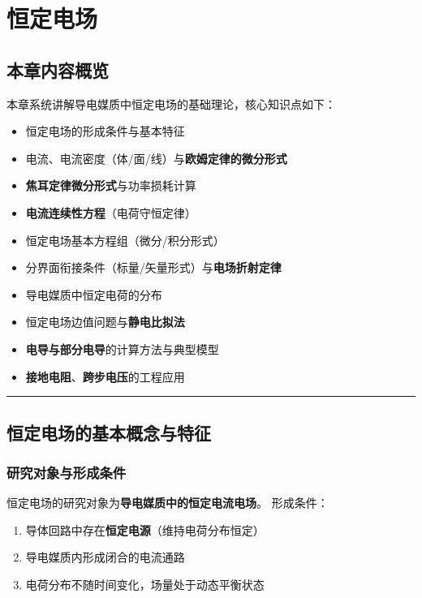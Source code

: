 
\section{恒定电场}

\subsection{本章内容概览}
本章系统讲解导电媒质中恒定电场的基础理论，核心知识点如下：
\begin{itemize}
    \item 恒定电场的形成条件与基本特征
    \item 电流、电流密度（体/面/线）与\textbf{欧姆定律的微分形式}
    \item \textbf{焦耳定律微分形式}与功率损耗计算
    \item \textbf{电流连续性方程}（电荷守恒定律）
    \item 恒定电场基本方程组（微分/积分形式）
    \item 分界面衔接条件（标量/矢量形式）与\textbf{电场折射定律}
    \item 导电媒质中恒定电荷的分布
    \item 恒定电场边值问题与\textbf{静电比拟法}
    \item \textbf{电导与部分电导}的计算方法与典型模型
    \item \textbf{接地电阻}、\textbf{跨步电压}的工程应用
\end{itemize}

\vspace{0.8cm}\hrule\vspace{0.8cm}

\subsection{恒定电场的基本概念与特征}
\subsubsection{研究对象与形成条件}
恒定电场的研究对象为\textbf{导电媒质中的恒定电流电场}。
形成条件：
\begin{enumerate}
    \item 导体回路中存在\textbf{恒定电源}（维持电荷分布恒定）
    \item 导电媒质内形成闭合的电流通路
    \item 电荷分布不随时间变化，场量处于动态平衡状态
\end{enumerate}


